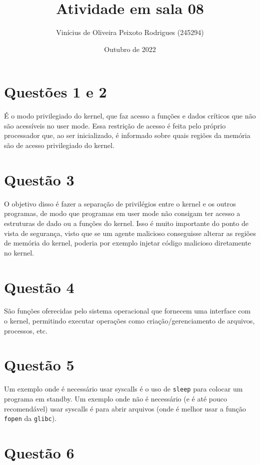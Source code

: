 \documentclass{article}
\title{Atividade em sala 08}
\author{Vinícius de Oliveira Peixoto Rodrigues (245294)}
\date{Outubro de 2022}
\begin{document}
\maketitle

\section*{Questões 1 e 2}

É o modo privilegiado do kernel, que faz acesso a funções e dados críticos que não são acessíveis no user mode. Essa restrição de acesso é feita pelo próprio processador que, ao ser inicializado, é informado sobre quais regiões da memória são de acesso privilegiado do kernel.

\section*{Questão 3}

O objetivo disso é fazer a separação de privilégios entre o kernel e os outros programas, de modo que programas em user mode não consigam ter acesso a estruturas de dado ou a funções do kernel. Isso é muito importante do ponto de vista de segurança, visto que se um agente malicioso conseguisse alterar as regiões de memória do kernel, poderia por exemplo injetar código malicioso diretamente no kernel.

\section*{Questão 4}

São funções oferecidas pelo sistema operacional que fornecem uma interface com o kernel, permitindo executar operações como criação/gerenciamento de arquivos, processos, etc.

\section*{Questão 5}

Um exemplo onde é necessário usar syscalls é o uso de \texttt{sleep} para colocar um programa em standby. Um exemplo onde não é necessário (e é até pouco recomendável) usar syscalls é para abrir arquivos (onde é melhor usar a função \texttt{fopen} da \texttt{glibc}).

\section*{Questão 6}
\end{document}

